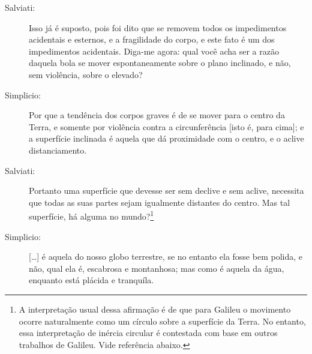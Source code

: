 \begin{description}
\item[Salviati:] Isso já é suposto, pois foi dito que se removem todos os impedimentos acidentais e esternos, e a fragilidade do corpo, e este fato é um dos impedimentos acidentais. Diga-me agora: qual você acha ser a razão  daquela bola se mover espontaneamente sobre o plano inclinado, e não, sem violência, sobre o elevado?

\item[Simplicio:] Por que a tendência dos corpos graves é de se mover para o centro da Terra, e somente por violência contra a circunferência [isto é, para cima]; e a superfície inclinada é aquela que dá proximidade com o centro, e o aclive distanciamento.

\item[Salviati:] Portanto uma superfície que devesse ser sem declive e sem aclive, necessita que todas as suas partes sejam igualmente distantes do centro. Mas tal superfície, há alguma no mundo?\footnote[][-2cm]{A interpretação usual dessa afirmação é de que para Galileu o movimento ocorre naturalmente como um círculo sobre a superfície da Terra. No entanto, essa interpretação de inércia circular é contestada com base em outros trabalhos de Galileu. Vide referência abaixo.}\cite{VASCONCELOS2005}

\item[Simplicio:] [\dots] é aquela do nosso globo terrestre, se no entanto ela fosse bem polida, e não, qual ela é, escabrosa e montanhosa; mas como é aquela da água, enquanto está plácida e tranquíla.


\end{description}

